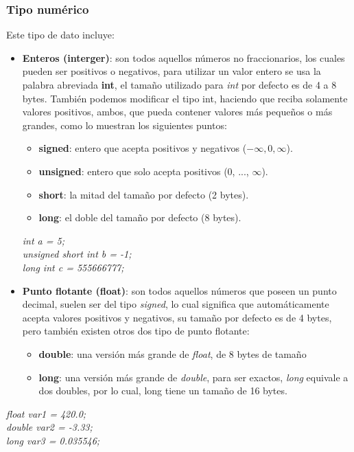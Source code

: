 \subsubsection{Tipo numérico}
\hspace{0.55cm}Este tipo de dato incluye:
\begin{itemize}
    \item \textbf{Enteros (interger)}: son todos aquellos números no fraccionarios, los cuales pueden ser positivos o negativos, para utilizar un valor entero se usa la palabra abreviada \textbf{int}, el tamaño utilizado para \textit{int} por defecto es de 4 a 8 bytes. También podemos modificar el tipo int, haciendo que reciba solamente valores positivos, ambos, que pueda contener valores más pequeños o más grandes, como lo muestran los siguientes puntos:
    \begin{itemize}
        \item \textbf{signed}: entero que acepta positivos y negativos ($-\infty, 0, \infty$).
        \item \textbf{unsigned}: entero que solo acepta positivos (0, ..., $\infty$).
        \item \textbf{short}: la mitad del tamaño por defecto (2 bytes).
        \item \textbf{long}: el doble del tamaño por defecto (8 bytes).
    \end{itemize}
    \begin{center}
        \textit{
			int a = 5; \\
			unsigned short int b = -1; \\
			long int c = 555666777;
        }
    \end{center}
    \item \textbf{Punto flotante (float)}: son todos aquellos números que poseen un punto decimal, suelen ser del tipo \textit{signed}, lo cual significa que automáticamente acepta valores positivos y negativos, su tamaño por defecto es de 4 bytes, pero también existen otros dos tipo de punto flotante:
    \begin{itemize}
        \item \textbf{double}: una versión más grande de \textit{float}, de 8 bytes de tamaño
        \item \textbf{long}: una versión más grande de \textit{double}, para ser exactos, \textit{long} equivale a dos doubles, por lo cual, long tiene un tamaño de 16 bytes.
    \end{itemize}
\end{itemize}
\begin{center}
    \textit{
		float var1 = 420.0; \\
		double var2 = -3.33; \\
		long var3 = 0.035546;
	}
\end{center}


